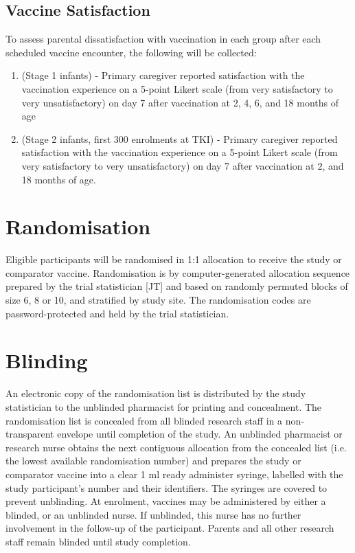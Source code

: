 \documentclass{bmcart}
\begin{document}
 \subsection*{Vaccine Satisfaction}

To assess parental dissatisfaction with vaccination in each group after each scheduled vaccine encounter, the following will be collected:
 \begin{enumerate}
     \item (Stage 1 infants) - Primary caregiver reported satisfaction with the vaccination experience on a 5-point Likert scale (from very satisfactory to very unsatisfactory) on day 7 after vaccination at 2, 4, 6, and 18 months of age
     \item (Stage 2 infants, first 300 enrolments at TKI) - Primary caregiver reported satisfaction with the vaccination experience on a 5-point Likert scale (from very satisfactory to very unsatisfactory) on day 7 after vaccination at 2, and 18 months of age.
 \end{enumerate}

\section*{Randomisation}

Eligible participants will be randomised in 1:1 allocation to receive the study or comparator vaccine.
Randomisation is by computer-generated allocation sequence prepared by the trial statistician [JT] and based on randomly permuted blocks of size 6, 8 or 10, and stratified by study site.
The randomisation codes are password-protected and held by the trial statistician.

\section*{Blinding}

An electronic copy of the randomisation list is distributed by the study statistician to the unblinded pharmacist for printing and concealment.
The randomisation list is concealed from all blinded research staff in a non-transparent envelope until completion of the study.
An unblinded pharmacist or research nurse obtains the next contiguous allocation from the concealed list (i.e. the lowest available randomisation number) and prepares the study or comparator vaccine into a clear 1 ml ready administer syringe, labelled with the study participant's number and their identifiers.
The syringes are covered to prevent unblinding.
At enrolment, vaccines may be administered by either a blinded, or an unblinded nurse.
If unblinded, this nurse has no further involvement in the follow-up of the participant.
Parents and all other research staff remain blinded until study completion.
\end{document}
